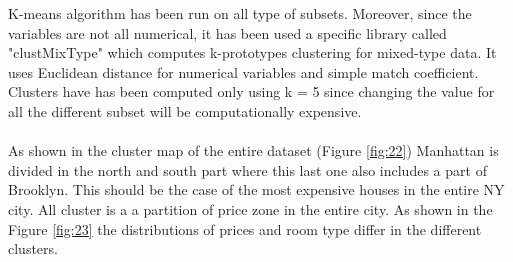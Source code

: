 \documentclass{FR16}
\begin{document}
K-means algorithm has been run on all type of subsets. Moreover, since the variables are not all numerical, it has been used a specific library called "clustMixType" which computes k-prototypes clustering for mixed-type data. It uses Euclidean distance for numerical variables and simple match coefficient. Clusters have has been computed only using k = 5 since changing the value for all the different subset will be computationally expensive. \\\\
As shown in the cluster map of the entire dataset (Figure \ref{fig:22}) Manhattan is divided in the north and south part where this last one also includes a part of Brooklyn. This should be the case of the most expensive houses in the entire NY city. All cluster is a a partition of price zone in the entire city. As shown in the Figure \ref{fig:23} the distributions of prices and room type differ in the different clusters.
\end{document}
